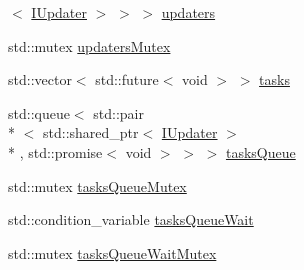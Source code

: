 \begin{DoxyCompactItemize}
$<$ \hyperlink{class_i_updater}{I\-Updater} $>$ $>$ $>$ \hyperlink{struct_threaded_chunked_temperature_world_updater_1_1_thread_data_a74f0ccd44d2f0d7ff69f363d30699d85}{updaters}
\item 
std\-::mutex \hyperlink{struct_threaded_chunked_temperature_world_updater_1_1_thread_data_a6c0d8bab86b56f10e84392aafc895488}{updaters\-Mutex}
\item 
std\-::vector$<$ std\-::future$<$ void $>$ $>$ \hyperlink{struct_threaded_chunked_temperature_world_updater_1_1_thread_data_ab084ac0c15a2536095bef8c9297361f5}{tasks}
\item 
std\-::queue$<$ std\-::pair\\*
$<$ std\-::shared\-\_\-ptr$<$ \hyperlink{class_i_updater}{I\-Updater} $>$\\*
, std\-::promise$<$ void $>$ $>$ $>$ \hyperlink{struct_threaded_chunked_temperature_world_updater_1_1_thread_data_ac72652dd6c97da60b3d4d1415ddb6f3d}{tasks\-Queue}
\item 
std\-::mutex \hyperlink{struct_threaded_chunked_temperature_world_updater_1_1_thread_data_a79a7bd3c8bcb2441418511bd54bf52ce}{tasks\-Queue\-Mutex}
\item 
std\-::condition\-\_\-variable \hyperlink{struct_threaded_chunked_temperature_world_updater_1_1_thread_data_a177bfecc3ca2c821c762743d36abc0ae}{tasks\-Queue\-Wait}
\item 
std\-::mutex \hyperlink{struct_threaded_chunked_temperature_world_updater_1_1_thread_data_ae7997a285fb8f3215745638c8201207e}{tasks\-Queue\-Wait\-Mutex}
\end{DoxyCompactItemize}


